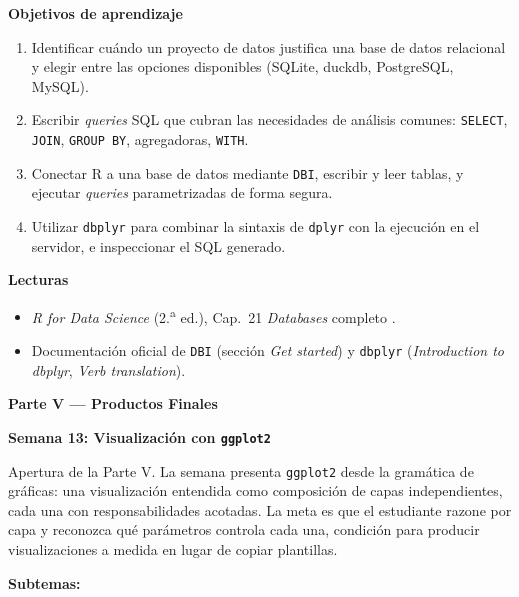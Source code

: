 \documentclass[11pt,letterpaper]{article}
\newcommand{\parteCurso}[1]{%
  \clearpage%
  \vspace*{0.5cm}%
  {\centering\color{main}\fontsize{26pt}{32pt}\selectfont\bfseries #1\par}%
  \vspace{0.8cm}%
}
\newcommand{\semana}[2]{%
  \bigskip%
  {\color{main}\Large\bfseries Semana #1: #2\par}%
  \smallskip%
}
\begin{document}
\medskip
\noindent\textbf{Objetivos de aprendizaje}
\begin{enumerate}[leftmargin=*, itemsep=1pt]
    \item Identificar cuándo un proyecto de datos justifica una base de datos relacional y elegir entre las opciones disponibles (SQLite, duckdb, PostgreSQL, MySQL).
    \item Escribir \textit{queries} SQL que cubran las necesidades de análisis comunes: \texttt{SELECT}, \texttt{JOIN}, \texttt{GROUP BY}, agregadoras, \texttt{WITH}.
    \item Conectar R a una base de datos mediante \texttt{DBI}, escribir y leer tablas, y ejecutar \textit{queries} parametrizadas de forma segura.
    \item Utilizar \texttt{dbplyr} para combinar la sintaxis de \texttt{dplyr} con la ejecución en el servidor, e inspeccionar el SQL generado.
\end{enumerate}

\medskip
\noindent\textbf{Lecturas}
\begin{itemize}[leftmargin=*, itemsep=1pt]
    \item \textit{R for Data Science} (2.\textsuperscript{a} ed.), Cap.\ 21 \textit{Databases} completo \cite{wickham2023r4ds}.
    \item Documentación oficial de \texttt{DBI} (sección \textit{Get started}) y \texttt{dbplyr} (\textit{Introduction to dbplyr}, \textit{Verb translation}).
\end{itemize}

\parteCurso{Parte V --- Productos Finales}

\semana{13}{Visualización con \texttt{ggplot2}}

Apertura de la Parte V. La semana presenta \texttt{ggplot2} desde la gramática de gráficas: una visualización entendida como composición de capas independientes, cada una con responsabilidades acotadas. La meta es que el estudiante razone por capa y reconozca qué parámetros controla cada una, condición para producir visualizaciones a medida en lugar de copiar plantillas.

\textbf{Subtemas:}
\end{document}
